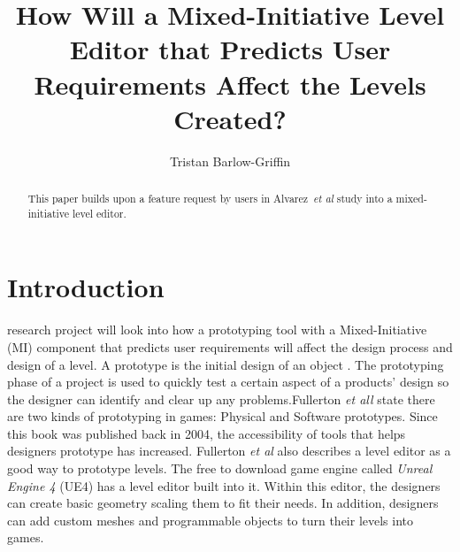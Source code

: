 \documentclass[journal]{IEEEtran}
\begin{document}
%
\title{ How Will a Mixed-Initiative Level Editor that Predicts User Requirements Affect the Levels Created?}
%
%

\author{Tristan Barlow-Griffin}


\maketitle

\begin{abstract}
This paper builds upon a feature request by users in Alvarez~\textit{et al}\cite{alvarez2018fostering} study into a mixed-initiative level editor.
\end{abstract}





\section{Introduction} \label{intro}
 research project will look into how a prototyping tool with a Mixed-Initiative (MI) component that predicts user requirements will affect the design process and design of a level. A prototype is the initial design of an object \cite{prototype}. The prototyping phase of a project is used to quickly test a certain aspect of a products' design so the designer can identify and clear up any problems\cite{budde1992prototyping}.Fullerton \textit{et all} \cite[p.~150]{fullerton2004game} state there are two kinds of prototyping in games: Physical and Software prototypes. Since this book was published back in 2004, the accessibility of tools that helps designers prototype has increased. Fullerton \textit{et al} \cite[p.~164]{fullerton2004game} also describes a level editor as a good way to prototype levels.  The free to download game engine called \textit{Unreal Engine 4} (UE4) has a level editor built into it. Within this editor, the designers can create basic geometry scaling them to fit their needs. In addition, designers can add custom meshes and programmable objects to turn their levels into games.
\end{document}
